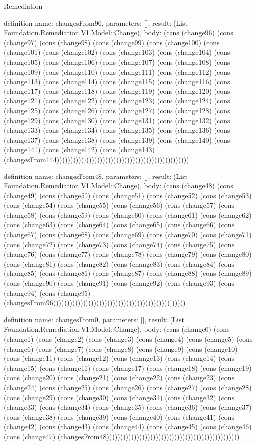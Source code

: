\begin{lexlean}{Remediation}
\begin{semanticmodule}
definition{
  name: changesFrom96,
  parameters: [],
  result: (List Foundation.Remediation.V1.Model::Change),
  body: (cons (change96) (cons (change97) (cons (change98) (cons (change99) (cons (change100) (cons (change101) (cons (change102) (cons (change103) (cons (change104) (cons (change105) (cons (change106) (cons (change107) (cons (change108) (cons (change109) (cons (change110) (cons (change111) (cons (change112) (cons (change113) (cons (change114) (cons (change115) (cons (change116) (cons (change117) (cons (change118) (cons (change119) (cons (change120) (cons (change121) (cons (change122) (cons (change123) (cons (change124) (cons (change125) (cons (change126) (cons (change127) (cons (change128) (cons (change129) (cons (change130) (cons (change131) (cons (change132) (cons (change133) (cons (change134) (cons (change135) (cons (change136) (cons (change137) (cons (change138) (cons (change139) (cons (change140) (cons (change141) (cons (change142) (cons (change143) (changesFrom144)))))))))))))))))))))))))))))))))))))))))))))))))
}

definition{
  name: changesFrom48,
  parameters: [],
  result: (List Foundation.Remediation.V1.Model::Change),
  body: (cons (change48) (cons (change49) (cons (change50) (cons (change51) (cons (change52) (cons (change53) (cons (change54) (cons (change55) (cons (change56) (cons (change57) (cons (change58) (cons (change59) (cons (change60) (cons (change61) (cons (change62) (cons (change63) (cons (change64) (cons (change65) (cons (change66) (cons (change67) (cons (change68) (cons (change69) (cons (change70) (cons (change71) (cons (change72) (cons (change73) (cons (change74) (cons (change75) (cons (change76) (cons (change77) (cons (change78) (cons (change79) (cons (change80) (cons (change81) (cons (change82) (cons (change83) (cons (change84) (cons (change85) (cons (change86) (cons (change87) (cons (change88) (cons (change89) (cons (change90) (cons (change91) (cons (change92) (cons (change93) (cons (change94) (cons (change95) (changesFrom96)))))))))))))))))))))))))))))))))))))))))))))))))
}

definition{
  name: changesFrom0,
  parameters: [],
  result: (List Foundation.Remediation.V1.Model::Change),
  body: (cons (change0) (cons (change1) (cons (change2) (cons (change3) (cons (change4) (cons (change5) (cons (change6) (cons (change7) (cons (change8) (cons (change9) (cons (change10) (cons (change11) (cons (change12) (cons (change13) (cons (change14) (cons (change15) (cons (change16) (cons (change17) (cons (change18) (cons (change19) (cons (change20) (cons (change21) (cons (change22) (cons (change23) (cons (change24) (cons (change25) (cons (change26) (cons (change27) (cons (change28) (cons (change29) (cons (change30) (cons (change31) (cons (change32) (cons (change33) (cons (change34) (cons (change35) (cons (change36) (cons (change37) (cons (change38) (cons (change39) (cons (change40) (cons (change41) (cons (change42) (cons (change43) (cons (change44) (cons (change45) (cons (change46) (cons (change47) (changesFrom48)))))))))))))))))))))))))))))))))))))))))))))))))
}


\end{semanticmodule}
\end{lexlean}
